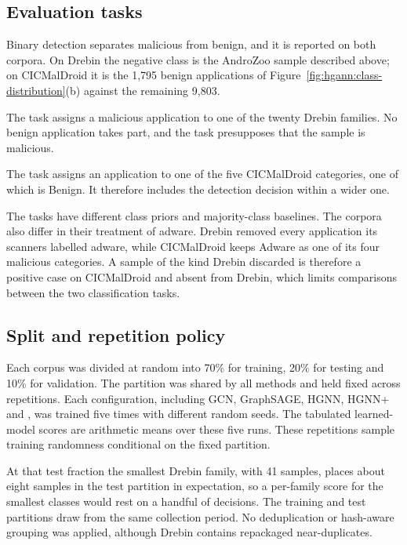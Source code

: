 \subsection*{Evaluation tasks}

Binary detection separates malicious from benign, and it is reported on both corpora. On Drebin
the negative class is the AndroZoo sample described above; on CICMalDroid it is the 1,795 benign
applications of Figure~\ref{fig:hgann:class-distribution}(b) against the remaining 9,803.

The \familyclassification{} task assigns a malicious application to one of the twenty Drebin
families. No benign application takes part, and the task presupposes that the sample is malicious.

The \categoryclassification{} task assigns an application to one of the five CICMalDroid
categories, one of which is Benign. It therefore includes the detection decision within a wider
one.

The tasks have different class priors and majority-class baselines.
The corpora also differ in their treatment of adware. Drebin removed every application
its scanners labelled adware, while CICMalDroid keeps Adware as one of its four malicious
categories. A sample of the kind Drebin discarded is therefore a positive case on CICMalDroid and
absent from Drebin, which limits comparisons between the two classification tasks.

\subsection*{Split and repetition policy}

Each corpus was divided at random into 70\% for training, 20\% for testing and
10\% for validation. The partition was shared by all methods and held fixed across
repetitions. Each configuration, including GCN, GraphSAGE, HGNN, HGNN+ and \hgann{}, was
trained five times with different random seeds. The tabulated learned-model scores are
arithmetic means over these five runs. These repetitions sample training randomness
conditional on the fixed partition.

At that test fraction the smallest Drebin family, with
41 samples, places about eight samples in the test partition in expectation, so a per-family score
for the smallest classes would rest on a handful of decisions. The training and test partitions
draw from the same collection period. No deduplication or hash-aware grouping was applied,
although Drebin contains repackaged near-duplicates.

